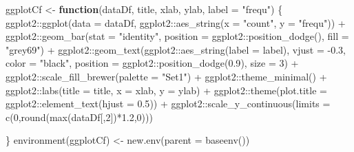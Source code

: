 \documentclass[
]{article}
\newenvironment{Shaded}{\begin{snugshade}}{\end{snugshade}}
\newcommand{\AttributeTok}[1]{\textcolor[rgb]{0.77,0.63,0.00}{#1}}
\newcommand{\ControlFlowTok}[1]{\textcolor[rgb]{0.13,0.29,0.53}{\textbf{#1}}}
\newcommand{\DecValTok}[1]{\textcolor[rgb]{0.00,0.00,0.81}{#1}}
\newcommand{\FloatTok}[1]{\textcolor[rgb]{0.00,0.00,0.81}{#1}}
\newcommand{\FunctionTok}[1]{\textcolor[rgb]{0.00,0.00,0.00}{#1}}
\newcommand{\NormalTok}[1]{#1}
\newcommand{\OtherTok}[1]{\textcolor[rgb]{0.56,0.35,0.01}{#1}}
\newcommand{\SpecialCharTok}[1]{\textcolor[rgb]{0.00,0.00,0.00}{#1}}
\newcommand{\StringTok}[1]{\textcolor[rgb]{0.31,0.60,0.02}{#1}}
\begin{document}
\begin{Shaded}
\begin{Highlighting}[]
\NormalTok{ggplotCf }\OtherTok{\textless{}{-}} \ControlFlowTok{function}\NormalTok{(dataDf, title, xlab, ylab, }\AttributeTok{label =} \StringTok{"frequ"}\NormalTok{) \{}
\NormalTok{  ggplot2}\SpecialCharTok{::}\FunctionTok{ggplot}\NormalTok{(}\AttributeTok{data =}\NormalTok{ dataDf, ggplot2}\SpecialCharTok{::}\FunctionTok{aes\_string}\NormalTok{(}\AttributeTok{x =} \StringTok{"count"}\NormalTok{, }\AttributeTok{y =} \StringTok{"frequ"}\NormalTok{)) }\SpecialCharTok{+} 
\NormalTok{    ggplot2}\SpecialCharTok{::}\FunctionTok{geom\_bar}\NormalTok{(}\AttributeTok{stat =} \StringTok{"identity"}\NormalTok{, }\AttributeTok{position =}\NormalTok{ ggplot2}\SpecialCharTok{::}\FunctionTok{position\_dodge}\NormalTok{(), }\AttributeTok{fill =} \StringTok{"grey69"}\NormalTok{) }\SpecialCharTok{+}
\NormalTok{    ggplot2}\SpecialCharTok{::}\FunctionTok{geom\_text}\NormalTok{(ggplot2}\SpecialCharTok{::}\FunctionTok{aes\_string}\NormalTok{(}\AttributeTok{label =}\NormalTok{ label), }\AttributeTok{vjust =} \SpecialCharTok{{-}}\FloatTok{0.3}\NormalTok{, }\AttributeTok{color =} \StringTok{"black"}\NormalTok{, }\AttributeTok{position =}\NormalTok{ ggplot2}\SpecialCharTok{::}\FunctionTok{position\_dodge}\NormalTok{(}\FloatTok{0.9}\NormalTok{), }\AttributeTok{size =} \DecValTok{3}\NormalTok{) }\SpecialCharTok{+}
\NormalTok{    ggplot2}\SpecialCharTok{::}\FunctionTok{scale\_fill\_brewer}\NormalTok{(}\AttributeTok{palette =} \StringTok{"Set1"}\NormalTok{) }\SpecialCharTok{+}
\NormalTok{    ggplot2}\SpecialCharTok{::}\FunctionTok{theme\_minimal}\NormalTok{() }\SpecialCharTok{+}
\NormalTok{    ggplot2}\SpecialCharTok{::}\FunctionTok{labs}\NormalTok{(}\AttributeTok{title =}\NormalTok{ title, }\AttributeTok{x =}\NormalTok{ xlab, }\AttributeTok{y =}\NormalTok{ ylab) }\SpecialCharTok{+}
\NormalTok{    ggplot2}\SpecialCharTok{::}\FunctionTok{theme}\NormalTok{(}\AttributeTok{plot.title =}\NormalTok{ ggplot2}\SpecialCharTok{::}\FunctionTok{element\_text}\NormalTok{(}\AttributeTok{hjust =} \FloatTok{0.5}\NormalTok{)) }\SpecialCharTok{+}
\NormalTok{    ggplot2}\SpecialCharTok{::}\FunctionTok{scale\_y\_continuous}\NormalTok{(}\AttributeTok{limits =} \FunctionTok{c}\NormalTok{(}\DecValTok{0}\NormalTok{,}\FunctionTok{round}\NormalTok{(}\FunctionTok{max}\NormalTok{(dataDf[,}\DecValTok{2}\NormalTok{])}\SpecialCharTok{*}\FloatTok{1.2}\NormalTok{,}\DecValTok{0}\NormalTok{)))}
    
\NormalTok{\}}
\FunctionTok{environment}\NormalTok{(ggplotCf) }\OtherTok{\textless{}{-}} \FunctionTok{new.env}\NormalTok{(}\AttributeTok{parent =} \FunctionTok{baseenv}\NormalTok{())}


\end{Highlighting}
\end{Shaded}
\end{document}
